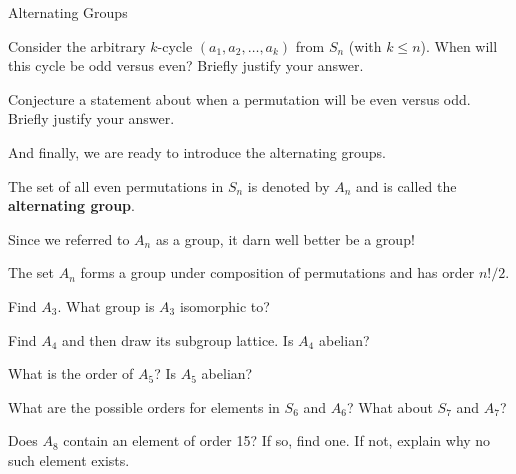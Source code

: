 \begin{section}{Alternating Groups}
\begin{problem}
Consider the arbitrary $k$-cycle $(a_1,a_2,\ldots, a_k)$ from $S_n$ (with $k\leq n$).  When will this cycle be odd versus even?  Briefly justify your answer. 
\end{problem}

\begin{problem}
Conjecture a statement about when a permutation will be even versus odd.  Briefly justify your answer.
\end{problem}

And finally, we are ready to introduce the alternating groups.

\begin{definition}
The set of all even permutations in $S_n$ is denoted by $A_n$ and is called the \textbf{alternating group}.
\end{definition}

Since we referred to $A_n$ as a group, it darn well better be a group!

\begin{theorem}
The set $A_n$ forms a group under composition of permutations and has order $n!/2$.
\end{theorem}

\begin{problem}
Find $A_3$.  What group is $A_3$ isomorphic to?
\end{problem}

\begin{problem}
Find $A_4$ and then draw its subgroup lattice. Is $A_4$ abelian?
\end{problem}

\begin{problem}
What is the order of $A_5$?  Is $A_5$ abelian?
\end{problem}

\begin{problem}
What are the possible orders for elements in $S_6$ and $A_6$?  What about $S_7$ and $A_7$?
\end{problem}

\begin{problem}
Does $A_8$ contain an element of order 15?  If so, find one.  If not, explain why no such element exists.
\end{problem}


\end{section}
